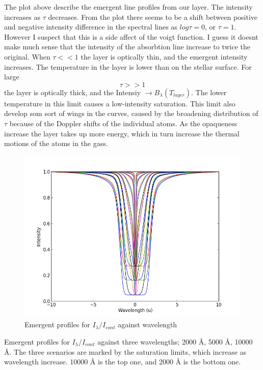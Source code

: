\documentclass[norsk,a4paper,12pt]{article}
\begin{document}
The plot above describe the emergent line profiles from our layer. The intensity increases as $\tau$ decreases. From the plot there seems  
 to be a shift between positive and negative intensity difference in the spectral lines as $log \tau = 0$, or $\tau = 1$. 
However I suspect that this is a side affect of the voigt function. I guess it doesnt make much sense that the intensity 
of the absorbtion line increase to twice the original.  
 When $\tau << 1$ the layer is optically thin, and the emergent intensity increases. 
The temperature in the layer is lower than on the stellar surface. 
For large $$\tau >> 1$$ the layer is optically thick, and the Intensiy $\longrightarrow B_{\lambda}(T_{layer})$.
The lower temperature in this limit causes a low-intensity saturation. This limit also develop som sort of wings in 
the curves, caused by the broadening distribution of $\tau $ because of the Doppler shifts of the individual atoms. 
As the opaqueness increase the layer takes up more energy, which in turn increase the thermal motions of
the atoms in the gass. 

\begin{figure}[H] 
\begin{center} 
\includegraphics[scale=0.5]{ssa33_3.png} 
 

\caption{Emergent profiles for $I_{\lambda}/I_{cont} $ against wavelength} 
\end{center} 
\end{figure}

Emergent profiles for $I_{\lambda}/I_{cont} $ against three wavelengths; 2000 Å, 5000 Å, 10000 Å.
The three scenarios are marked by the saturation limits, which increase as wavelength increase. 10000 Å is the top one, 
and 2000 Å is the bottom one.
\end{document}
